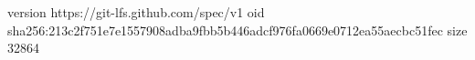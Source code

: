 version https://git-lfs.github.com/spec/v1
oid sha256:213c2f751e7e1557908adba9fbb5b446adcf976fa0669e0712ea55aecbc51fec
size 32864

